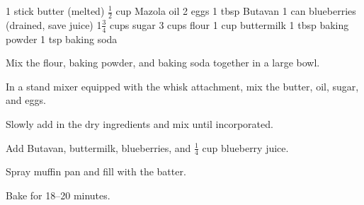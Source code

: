 \dishtype{\breakfast}
\dishother{\vegetarian}
\begin{ingreds}
    1 stick butter (melted)
    $\frac{1}{2}$ cup Mazola oil
    2 eggs
    1 tbsp Butavan
    1 can blueberries (drained, save juice)
    1$\frac{3}{4}$ cups sugar
    3 cups flour
    1 cup buttermilk
    1 tbsp baking powder
    1 tsp baking soda
\end{ingreds}
\begin{method}
    Mix the flour, baking powder, and baking soda together in a large bowl.\par
    In a stand mixer equipped with the whisk attachment, mix the butter, oil, sugar, and eggs.\par
    Slowly add in the dry ingredients and mix until incorporated.\par
    Add Butavan, buttermilk, blueberries, and $\frac{1}{4}$ cup blueberry juice.\par
    Spray muffin pan and fill with the batter.\par
    Bake for 18--20 minutes.\par
\end{method}